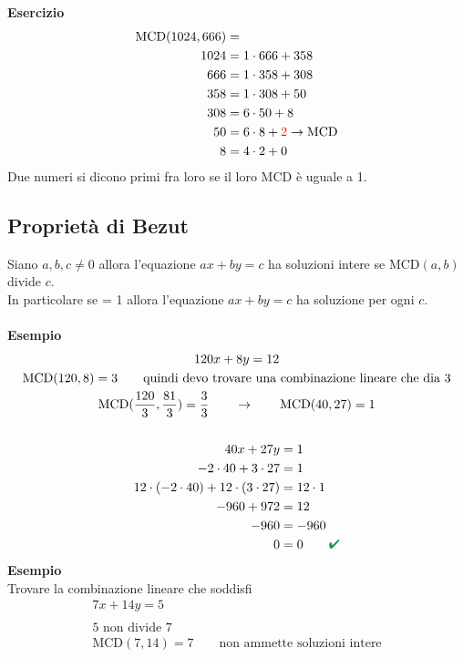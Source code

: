 \documentclass[italian]{article}
\newcommand{\mcd}[2]{\text{$\text{MCD}(#1, #2)$}}
\renewcommand{\checkmark}{\textcolor{ForestGreen}{\text{$\qquad$\ding{52}}}}
\begin{document}
\newpage
\textbf{Esercizio}
\begin{gather*}
	\begin{align*}
		\mcd{1024}{666} &= \\
		1024 &= 1 \cdot 666 + 358 \\
		666 &= 1 \cdot 358 + 308\\
		358 &= 1\cdot 308 + 50 \\
		308 &= 6\cdot 50 + 8\\
		50 &= 6\cdot 8 + \textcolor{red}{2} \to \text{MCD}\\
		8 &= 4\cdot 2 + 0
	\end{align*}
\end{gather*}
Due numeri si dicono primi fra loro se il loro MCD è uguale a 1.

\subsection{Proprietà di Bezut}
Siano $a,b,c \neq 0$ allora l'equazione $ax + by = c$ ha soluzioni intere se $\mcd{a}{b}$ divide $c$.\\[2mm]
In particolare se \mcd{a}{b} = 1 allora l'equazione $ax + by = c$ ha soluzione per ogni $c$.\\\\
\textbf{Esempio}
\begin{gather*}
	120x + 8y = 12\\
	\mcd{120}{8} = 3 \qquad \text{quindi devo trovare una combinazione lineare che dia 3}\\
	\mcd{\frac{120}{3}}{\frac{81}{3}} = \frac{3}{3} \qquad \to \qquad  \mcd{40}{27} = 1\\\\
	\begin{split}
		40x+27y&=1\\
		-2\cdot 40 + 3\cdot 27 &= 1\\
		12\cdot(-2\cdot 40) + 12\cdot(3\cdot 27) &= 12 \cdot 1\\
		-960 + 972 &= 12\\
		-960 &= -960 \\
		0 &= 0 \checkmark
	\end{split} 
\end{gather*}
\textbf{Esempio}\\[2mm]
Trovare la combinazione lineare che soddisfi
\begin{gather*}
	7x+14y = 5\\\\
	5 \text{ non divide 7}\\
	\mcd{7}{14} = 7 \qquad \text{non ammette soluzioni intere}
\end{gather*}
\newpage
\end{document}
